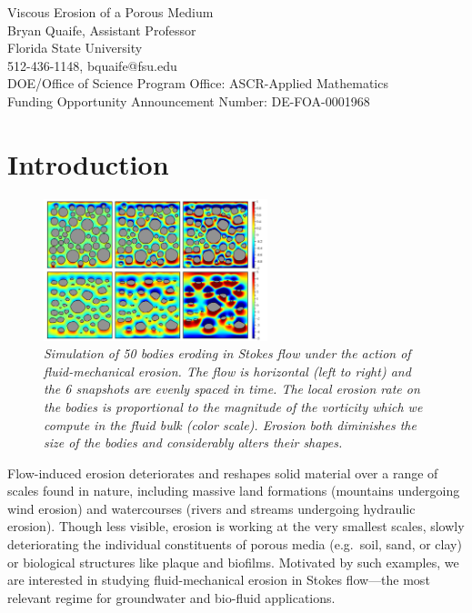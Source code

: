\documentclass[11pt]{article}
\begin{document}
\begin{center}
Viscous Erosion of a Porous Medium \\
Bryan Quaife, Assistant Professor \\
Florida State University \\
512-436-1148, bquaife@fsu.edu \\
DOE/Office of Science Program Office: ASCR-Applied Mathematics \\
Funding Opportunity Announcement Number: DE-FOA-0001968
\end{center}

\section{Introduction}
\begin{figure}
\centering
\includegraphics[width=0.58\textwidth]{figs/50bod.pdf}
\caption{\label{fig:50bod} \em Simulation of 50 bodies eroding in Stokes
flow under the action of fluid-mechanical erosion. The flow is
horizontal (left to right) and the 6 snapshots are evenly spaced in
time.  The local erosion rate on the bodies is proportional to the
magnitude of the vorticity which we compute in the fluid bulk (color
scale).  Erosion both diminishes the size of the bodies and considerably
alters their shapes.}
\end{figure}

Flow-induced erosion deteriorates and reshapes solid material over a
range of scales found in nature, including massive land formations
(mountains undergoing wind erosion) and watercourses (rivers and streams
undergoing hydraulic erosion).  Though less visible, erosion is working
at the very smallest scales, slowly deteriorating the individual
constituents of porous media (e.g.~soil, sand, or clay) or biological
structures like plaque and biofilms. Motivated by such examples, we are
interested in studying fluid-mechanical erosion in Stokes flow---the
most relevant regime for groundwater and bio-fluid applications.
\end{document}
